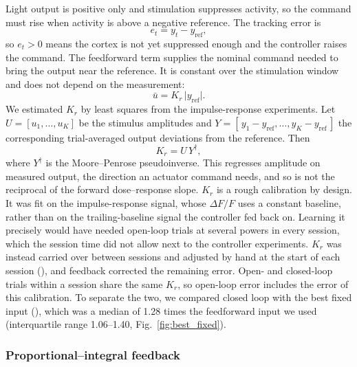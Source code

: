 Light output is positive only and stimulation suppresses activity, so the command must rise when activity is above a negative reference.
The tracking error is
%
\begin{equation}
    e_{t} = y_{t} - y_{\mathrm{ref}},
    \label{eq:error}
\end{equation}
%
so $e_t > 0$ means the cortex is not yet suppressed enough and the controller raises the command.
The feedforward term supplies the nominal command needed to bring the output near the reference.
It is constant over the stimulation window and does not depend on the measurement:
%
\begin{equation}
    \bar{u} = K_{r}\,\lvert y_{\mathrm{ref}} \rvert .
    \label{eq:ff}
\end{equation}
%
We estimated $K_{r}$ by least squares from the impulse-response experiments.
Let $U = [u_{1},\ldots,u_{K}]$ be the stimulus amplitudes and $Y = [\,y_{1} - y_{\mathrm{ref}},\ldots,y_{K} - y_{\mathrm{ref}}\,]$ the corresponding trial-averaged output deviations from the reference.
Then
%
\begin{equation}
    K_{r} = U\,Y^{\dagger},
    \label{eq:kr}
\end{equation}
%
where $Y^{\dagger}$ is the Moore--Penrose pseudoinverse.
This regresses amplitude on measured output, the direction an actuator command needs, and so is not the reciprocal of the forward dose--response slope.
$K_r$ is a rough calibration by design.
It was fit on the impulse-response signal, whose $\Delta F/F$ uses a constant baseline, rather than on the trailing-baseline signal the controller fed back on.
Learning it precisely would have needed open-loop trials at several powers in every session, which the session time did not allow next to the controller experiments.
$K_r$ was instead carried over between sessions and adjusted by hand at the start of each session (), and feedback corrected the remaining error.
Open- and closed-loop trials within a session share the same $K_r$, so open-loop error includes the error of this calibration.
To separate the two, we compared closed loop with the best fixed input (), which was a median of 1.28 times the feedforward input we used (interquartile range 1.06--1.40, Fig.~\ref{fig:best_fixed}).

\subsubsection*{Proportional--integral feedback}
\label{sec:pi_controller_design}

